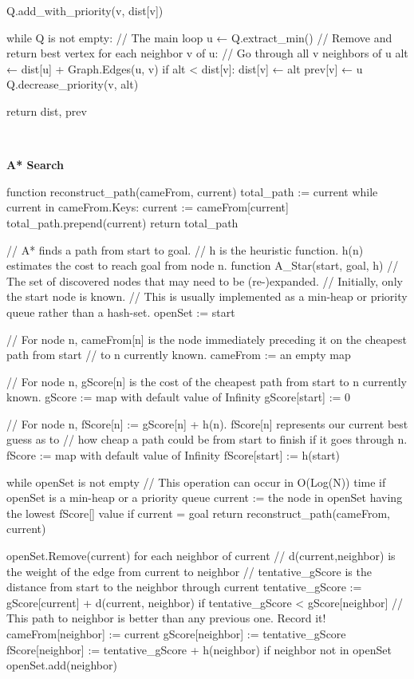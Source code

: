 \begin{FlushLeft}
\begin{pseudocode}
        Q.add_with_priority(v, dist[v])


    while Q is not empty:                      // The main loop
        u ← Q.extract_min()                    // Remove and return best vertex
        for each neighbor v of u:              // Go through all v neighbors of u
            alt ← dist[u] + Graph.Edges(u, v)
            if alt < dist[v]:
                dist[v] ← alt
                prev[v] ← u
                Q.decrease_priority(v, alt)

    return dist, prev
    \end{pseudocode} \\ \BK

    \textbf{A* Search} \\
    \begin{pseudocode}
function reconstruct_path(cameFrom, current)
    total_path := {current}
    while current in cameFrom.Keys:
        current := cameFrom[current]
        total_path.prepend(current)
    return total_path

// A* finds a path from start to goal.
// h is the heuristic function. h(n) estimates the cost to reach goal from node n.
function A_Star(start, goal, h)
    // The set of discovered nodes that may need to be (re-)expanded.
    // Initially, only the start node is known.
    // This is usually implemented as a min-heap or priority queue rather than a hash-set.
    openSet := {start}

    // For node n, cameFrom[n] is the node immediately preceding it on the cheapest path from start
    // to n currently known.
    cameFrom := an empty map

    // For node n, gScore[n] is the cost of the cheapest path from start to n currently known.
    gScore := map with default value of Infinity
    gScore[start] := 0

    // For node n, fScore[n] := gScore[n] + h(n). fScore[n] represents our current best guess as to
    // how cheap a path could be from start to finish if it goes through n.
    fScore := map with default value of Infinity
    fScore[start] := h(start)

    while openSet is not empty
        // This operation can occur in O(Log(N)) time if openSet is a min-heap or a priority queue
        current := the node in openSet having the lowest fScore[] value
        if current = goal
            return reconstruct_path(cameFrom, current)

        openSet.Remove(current)
        for each neighbor of current
            // d(current,neighbor) is the weight of the edge from current to neighbor
            // tentative_gScore is the distance from start to the neighbor through current
            tentative_gScore := gScore[current] + d(current, neighbor)
            if tentative_gScore < gScore[neighbor]
                // This path to neighbor is better than any previous one. Record it!
                cameFrom[neighbor] := current
                gScore[neighbor] := tentative_gScore
                fScore[neighbor] := tentative_gScore + h(neighbor)
                if neighbor not in openSet
                    openSet.add(neighbor)


\end{pseudocode}
\end{FlushLeft}
